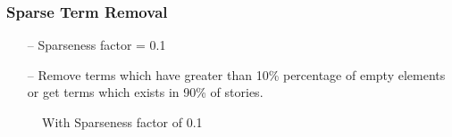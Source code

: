 \documentclass{beamer}
\begin{document}
\begin{frame}[noframenumbering]
\frametitle{Sparse Term Removal}
\begin{itemize}
\item[--] Sparseness factor = 0.1
\item[--] Remove terms which have greater than 10\% percentage of empty elements or get terms which exists in 90\% of stories.
\end{itemize}
\begin{figure}[h] 
\centering
{}
\centering
\caption{With Sparseness factor of 0.1}
\label{DTM}
\end{figure}
\end{frame}
\end{document}
